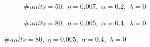 \documentclass[11pt]{article}
\begin{document}
\begin{figure}[H]
\begin{subfigure}[b]{0.45\textwidth}
     \end{subfigure}
     \begin{subfigure}[b]{0.45\textwidth}
         \centering
        \vspace{-0.74cm}
         \caption{$\# units = 50,\,\, \eta = 0.007,\,\, \alpha = 0.2,\,\, \lambda = 0$}
         \label{fig:under_3}
     \end{subfigure}
     \hfill
     \begin{subfigure}[b]{0.45\textwidth}
         \centering
        \vspace{-0.74cm}
         \caption{$\# units = 80,\,\, \eta = 0.005,\,\, \alpha = 0.4,\,\, \lambda = 0$}
         \label{fig:under_4}

\end{subfigure}
\end{figure}
\end{document}
